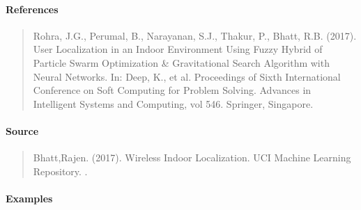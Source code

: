 \documentclass[letterpaper,10pt,english,openany,oneside]{sphinxmanual}
\begin{document}
\begin{fulllineitems}
\paragraph{References}
\label{\detokenize{api_reference/generated/QuadratiK.datasets.load_wireless_data:references}}\begin{quote}

\sphinxAtStartPar
Rohra, J.G., Perumal, B., Narayanan, S.J., Thakur, P., Bhatt, R.B. (2017). 
User Localization in an Indoor Environment Using Fuzzy Hybrid of Particle Swarm Optimization 
\& Gravitational Search Algorithm with Neural Networks. In: Deep, K., et al. Proceedings of 
Sixth International Conference on Soft Computing for Problem Solving. Advances in Intelligent 
Systems and Computing, vol 546. Springer, Singapore. 
\end{quote}


\paragraph{Source}
\label{\detokenize{api_reference/generated/QuadratiK.datasets.load_wireless_data:source}}\begin{quote}

\sphinxAtStartPar
Bhatt,Rajen. (2017). Wireless Indoor Localization. UCI Machine Learning Repository.
.
\end{quote}


\paragraph{Examples}
\label{\detokenize{api_reference/generated/QuadratiK.datasets.load_wireless_data:examples}}
\begin{sphinxVerbatim}[commandchars=\\\{\}]
   
   
\end{sphinxVerbatim}

\end{fulllineitems}



\end{document}
